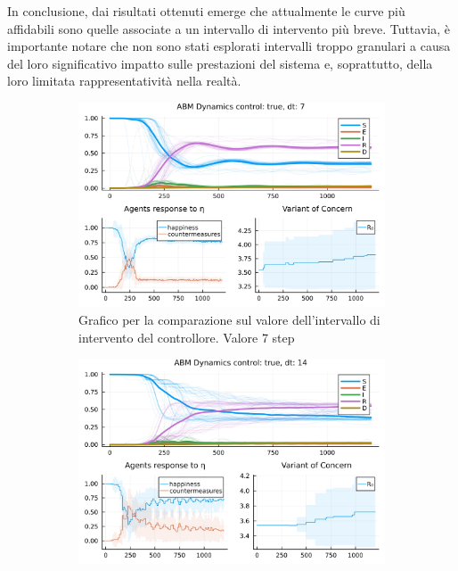 In conclusione, dai risultati ottenuti emerge che attualmente le curve 
più affidabili sono quelle associate a un intervallo di intervento più 
breve. Tuttavia, è importante notare che non sono stati esplorati 
intervalli troppo granulari a causa del loro significativo impatto 
sulle prestazioni del sistema e, soprattutto, della loro limitata 
rappresentatività nella realtà.

\begin{figure}[H]
	\centering
	\begin{subfigure}[b]{0.45\textwidth}
		\centering
		\includegraphics[width=\textwidth]{img/SocialNetworkABM_1_DT.jpg}
		\caption{Grafico per la comparazione sul valore dell'intervallo di intervento del controllore. Valore 7 step}
		\label{fig:comparison_dt_7}
	\end{subfigure}
	\hfill
	\begin{subfigure}[b]{0.45\textwidth}
		\centering
		\includegraphics[width=\textwidth]{img/SocialNetworkABM_2_DT.jpg}

\end{subfigure}
\end{figure}
